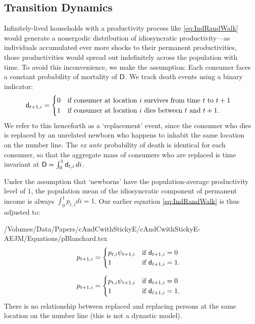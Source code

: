 \documentclass[titlepage]{./econtex}
\begin{document}
\subsection{Transition Dynamics}

Infinitely-lived households with a productivity process like \eqref{eq:IndRandWalk} would generate a nonergodic distribution of idiosyncratic productivity---as individuals accumulated ever more shocks to their permanent productivities, those productivities would spread out indefinitely across the population with time. To avoid this inconvenience, we make the \cite{blanchardFinite} assumption: Each consumer faces a constant probability of mortality of $\mathsf{D}$. We track death events using a binary indicator:
\begin{equation*}
\mathsf{d}_{t+1,i} =
  \begin{cases}
    0 & \text{if consumer at location $i$ survives from time $t$ to $t+1$}
\\    1 & \text{if consumer at location $i$ dies between $t$ and $t+1$}.
  \end{cases}
\end{equation*}
We refer to this henceforth as a `replacement' event, since the consumer who dies is replaced by an unrelated newborn who happens to inhabit the same location on the number line.  The {\it ex ante} probability of death is identical for each consumer, so that the aggregate mass of consumers who are replaced is time invariant at $\mathsf{D} = \int_{0}^{1} \mathsf{d}_{t,i}\,di$.

Under the assumption that `newborns' have the population-average productivity level of $1$, the population mean of the idiosyncratic component of permanent income is always $\int_{0}^{1} {p}_{t,i}di = 1$. Our earlier equation \eqref{eq:IndRandWalk} is thus adjusted to:

\begin{verbatimwrite}{/Volumes/Data/Papers/cAndCwithStickyE/cAndCwithStickyE-AEJM/Equations/pBlanchard.tex}
\begin{equation*}  
{p}_{t+1,i} =
  \begin{cases}
       {p}_{t,i} \psi_{t+1,i} & \text{if } \mathsf{d}_{t+1,i} = 0 \\
    1 & \text{if } \mathsf{d}_{t+1,i} = 1. \\
  \end{cases}
\end{equation*}
\end{verbatimwrite}
\begin{equation*}  
{p}_{t+1,i} =
  \begin{cases}
       {p}_{t,i} \psi_{t+1,i} & \text{if } \mathsf{d}_{t+1,i} = 0 \\
    1 & \text{if } \mathsf{d}_{t+1,i} = 1. \\
  \end{cases}
\end{equation*}
 There is no relationship between replaced and replacing persons at the same location on the number line (this is not a dynastic model).
\end{document}

